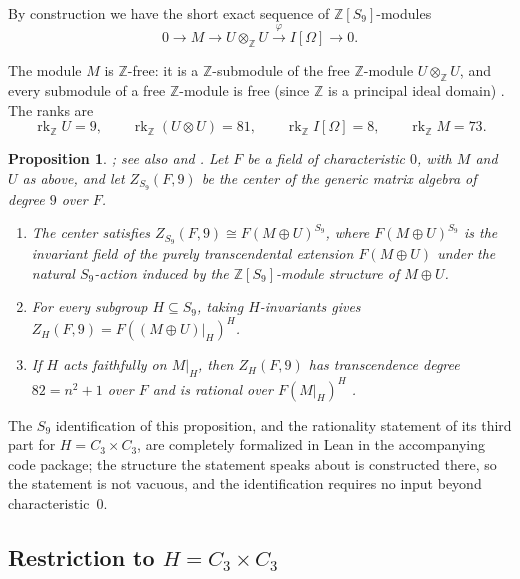 \documentclass[12pt,a4paper]{article}
\newtheorem{proposition}[theorem]{Proposition}
\theoremstyle{definition}
\DeclareMathOperator{\rk}{rk}
\begin{document}
By construction we have the short exact sequence of \(\mathbb{Z}[S_9]\)-modules
\begin{equation}\label{eq:procesi-S9}
0 \longrightarrow M \longrightarrow U \otimes_{\mathbb{Z}} U \xrightarrow{\
\varphi\ } I[\Omega] \longrightarrow 0 .
\end{equation}

The module \(M\) is \(\mathbb{Z}\)-free: it is a \(\mathbb{Z}\)-submodule of the
free \(\mathbb{Z}\)-module \(U \otimes_{\mathbb{Z}} U\), and every submodule of
a free \(\mathbb{Z}\)-module is free (since \(\mathbb{Z}\) is a principal ideal
domain)
\cite[Ch.VII, \S3, Th.1, Cor.2]{Bourbaki2007b}.
The ranks are
\[
\rk_{\mathbb{Z}} U = 9,\qquad
\rk_{\mathbb{Z}}(U \otimes U) = 81,\qquad
\rk_{\mathbb{Z}} I[\Omega] = 8,\qquad
\rk_{\mathbb{Z}} M = 73.
\]

\begin{proposition}\label{rem:procesi-geometric}
\cite{Procesi1967}; see also \cite[\S5]{ABGV2011} and
\cite{Formanek2002}.  Let \(F\) be a field of characteristic \(0\), with
\(M\) and \(U\) as
above, and let \(Z_{S_9}(F,9)\) be the center of the generic matrix algebra
of degree \(9\) over \(F\).
\begin{enumerate}
\item The center satisfies
  \(Z_{S_9}(F,9) \cong F(M \oplus U)^{S_9}\), where
  \(F(M \oplus U)^{S_9}\) is the invariant field of the purely
  transcendental extension \(F(M \oplus U)\) under the natural
  \(S_9\)-action induced by the \(\mathbb{Z}[S_9]\)-module structure of
  \(M \oplus U\).
\item For every subgroup \(H \subseteq S_9\), taking \(H\)-invariants
  gives \(Z_H(F,9) = F((M \oplus U)|_H)^H\).
\item If \(H\) acts faithfully on \(M|_H\), then \(Z_H(F,9)\) has
  transcendence degree \(82 = n^2+1\) over \(F\) and is \emph{rational}
  over \(F(M|_H)^H\) \cite[Proposition~1.4]{Lenstra1974}.
\end{enumerate}
\end{proposition}

The \(S_9\) identification of this proposition, and the rationality statement
of its third part for \(H = C_3 \times C_3\), are completely formalized in Lean
in the accompanying code package; the structure the statement speaks about is
constructed there, so the statement is not vacuous, and the identification
requires no input beyond characteristic~\(0\).

\subsection{Restriction to \(H = C_3 \times C_3\)}
\end{document}
